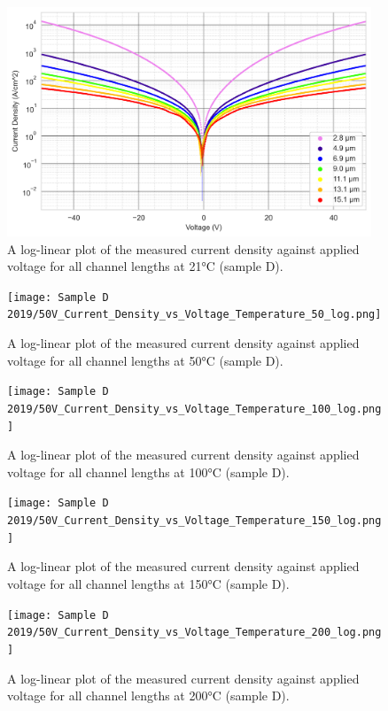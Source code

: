 \label{app:J_V_sample_D_50V}
\begin{figure}[h]
    \centering
    \includegraphics[width=0.97\textwidth]{Chapter3/Figs/Raster/Sample D 2019/50V_Current_Density_vs_Voltage_Temperature_21_log.png}
    \caption{A log-linear plot of the measured current density against applied voltage for all channel lengths at 21\si{\degreeCelsius} (sample D).}
    \label{appfig:D_current_density_21_50v}
\end{figure}
\begin{figure}[h]
    \centering
    \texttt{[image: Sample D 2019/50V\_Current\_Density\_vs\_Voltage\_Temperature\_50\_log.png]}
    \caption{A log-linear plot of the measured current density against applied voltage for all channel lengths at 50\si{\degreeCelsius} (sample D).}
    \label{appfig:D_current_density_50_50v}
\end{figure}
\begin{figure}[h]
    \centering
    \texttt{[image: Sample D 2019/50V\_Current\_Density\_vs\_Voltage\_Temperature\_100\_log.png]}
    \caption{A log-linear plot of the measured current density against applied voltage for all channel lengths at 100\si{\degreeCelsius} (sample D).}
    \label{appfig:D_current_density_100_50}
\end{figure}
\begin{figure}[h]
    \centering
    \texttt{[image: Sample D 2019/50V\_Current\_Density\_vs\_Voltage\_Temperature\_150\_log.png]}
    \caption{A log-linear plot of the measured current density against applied voltage for all channel lengths at 150\si{\degreeCelsius} (sample D).}
    \label{appfig:D_current_density_150_50v}
\end{figure}
\begin{figure}[h]
    \centering
    \texttt{[image: Sample D 2019/50V\_Current\_Density\_vs\_Voltage\_Temperature\_200\_log.png]}
    \caption{A log-linear plot of the measured current density against applied voltage for all channel lengths at 200\si{\degreeCelsius} (sample D).}
    \label{appfig:D_current_density_200_50v}
\end{figure}
